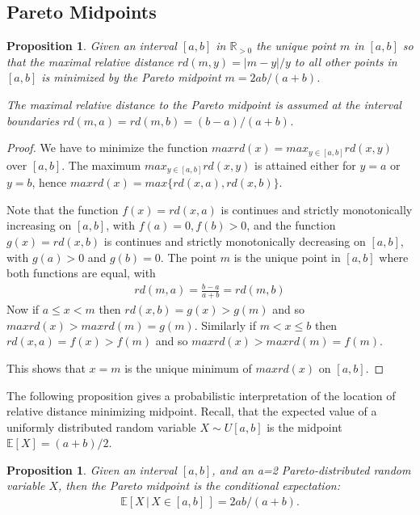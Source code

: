 \documentclass{article}
\theoremstyle{plain}
\newtheorem{proposition}[definition]{Proposition}
\theoremstyle{remark}
\newcommand{\IE}{\mathbb{E}}
\newcommand{\IR}{\mathbb{R}}
\begin{document}
\subsection{Pareto Midpoints}

\begin{proposition} \label{prop:pdist}
  Given an interval $[a,b]$ in $\IR_{>0}$ the unique point $m$ in $[a,b]$ so that the maximal
  relative distance $rd(m, y) = |m-y|/y$ to all other points in $[a,b]$ is minimized
  by the Pareto midpoint
  $m = 2ab / (a + b)$.

  The maximal relative distance to the Pareto midpoint is assumed at the interval boundaries
  $rd(m,a) = rd(m,b) = (b - a) / (a + b)$.
\end{proposition}

\begin{proof}
  We have to minimize the function $maxrd(x) = max_{y\in[a,b]} rd(x, y)$ over $[a,b]$.
  The maximum $max_{y\in[a,b]} rd(x, y)$ is attained either for $y = a$ or $y = b$,
  hence $maxrd(x) = max\{ rd(x,a), rd(x,b) \}$.

  Note that the function $f(x) = rd(x, a)$ is continues and strictly monotonically increasing on $[a,b]$, with $f(a) = 0, f(b) > 0$,
  and the function $g(x) = rd(x, b)$ is continues and strictly monotonically decreasing on $[a,b]$, with $g(a) > 0$ and $g(b) = 0$.
  The point $m$ is the unique point in $[a,b]$ where both functions are equal, with
  \begin{align*}
    rd(m, a) = \frac{b - a}{a + b} = rd(m, b)
  \end{align*}
  Now if $a \leq x < m$ then $rd(x, b) = g(x) > g(m)$ and so $maxrd(x) > maxrd(m) = g(m)$.
  Similarly if $m < x \leq b$ then $rd(x, a) = f(x) > f(m)$ and so $maxrd(x) > maxrd(m) = f(m)$.

  This shows that $x=m$ is the unique minimum of $maxrd(x)$ on $[a,b]$.
\end{proof}

The following proposition gives a probabilistic interpretation of the location of relative distance minimizing midpoint.
Recall, that the expected value of a uniformly distributed random variable $X \sim U[a,b]$ is the midpoint $\IE[X] = (a+b)/2$.

\begin{proposition}
  Given an interval $[a,b]$, and an a=2 Pareto-distributed random variable $X$, then
  the Pareto midpoint is the conditional expectation:
  \begin{align*}
    \IE[ X \, | \, X \in [a,b] \,] = 2ab / (a + b).
  \end{align*}
\end{proposition}
\end{document}

